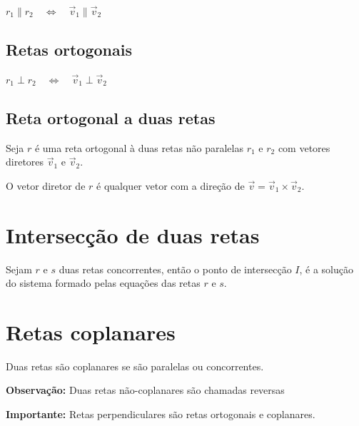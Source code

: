 $r_1\parallel r_2 \quad\Longleftrightarrow \quad \vec v_1 \parallel \vec v_2$

\subsection{Retas ortogonais}

$r_1\perp r_2 \quad\Longleftrightarrow \quad \vec v_1 \perp \vec v_2$

\subsection{Reta ortogonal a duas retas}

Seja $r$ é uma reta ortogonal à duas retas não paralelas $r_1$ e $r_2$ com vetores diretores $\vec v_1$ e $\vec v_2$.

O vetor diretor de $r$ é qualquer vetor com a direção de $\vec v=\vec v_1 \times \vec v_2$.


\section{Intersecção de duas retas}

Sejam $r$ e $s$ duas retas concorrentes, então o ponto de intersecção $I$, é a solução do sistema formado pelas equações das retas $r$ e $s$.

\section{Retas coplanares}

Duas retas são coplanares se são paralelas ou concorrentes.

\textbf{Observação:} Duas retas não-coplanares são chamadas reversas

\textbf{Importante:} Retas perpendiculares são retas ortogonais e coplanares.